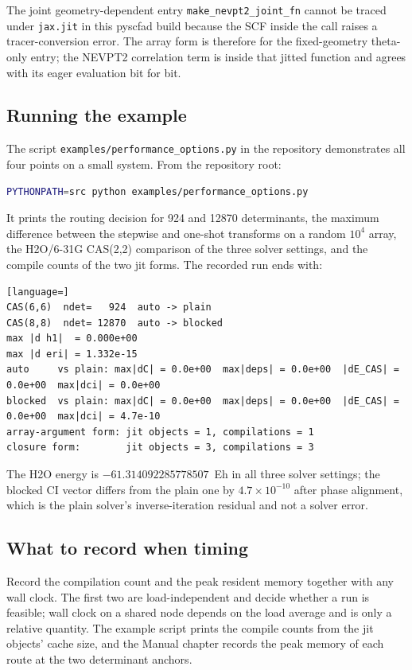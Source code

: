The joint geometry-dependent entry \texttt{make\_nevpt2\_joint\_fn}
cannot be traced under \texttt{jax.jit} in this pyscfad build because
the SCF inside the call raises a tracer-conversion error.  The array
form is therefore for the fixed-geometry theta-only entry; the NEVPT2
correlation term is inside that jitted function and agrees with its
eager evaluation bit for bit.

\subsection{Running the example}

The script \texttt{examples/performance\_options.py} in the repository
demonstrates all four points on a small system.  From the repository
root:

\begin{lstlisting}[language=bash]
PYTHONPATH=src python examples/performance_options.py
\end{lstlisting}

It prints the routing decision for 924 and 12870 determinants, the
maximum difference between the stepwise and one-shot transforms on a
random $10^4$ array, the H2O/6-31G CAS(2,2) comparison of the three
solver settings, and the compile counts of the two jit forms.  The
recorded run ends with:

\begin{lstlisting}[language=]
CAS(6,6)  ndet=   924  auto -> plain
CAS(8,8)  ndet= 12870  auto -> blocked
max |d h1|  = 0.000e+00
max |d eri| = 1.332e-15
auto     vs plain: max|dC| = 0.0e+00  max|deps| = 0.0e+00  |dE_CAS| = 0.0e+00  max|dci| = 0.0e+00
blocked  vs plain: max|dC| = 0.0e+00  max|deps| = 0.0e+00  |dE_CAS| = 0.0e+00  max|dci| = 4.7e-10
array-argument form: jit objects = 1, compilations = 1
closure form:        jit objects = 3, compilations = 3
\end{lstlisting}

The H2O energy is $-61.314092285778507$~Eh in all three solver
settings; the blocked CI vector differs from the plain one by
$4.7\times10^{-10}$ after phase alignment, which is the plain solver's
inverse-iteration residual and not a solver error.

\subsection{What to record when timing}

Record the compilation count and the peak resident memory together
with any wall clock.  The first two are load-independent and decide
whether a run is feasible; wall clock on a shared node depends on the
load average and is only a relative quantity.  The example script
prints the compile counts from the jit objects' cache size, and the
Manual chapter records the peak memory of each route at the two
determinant anchors.
